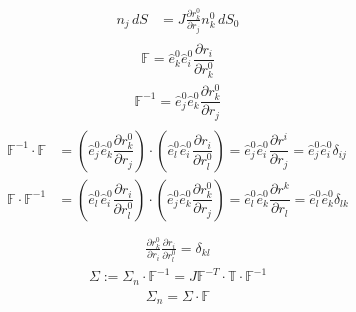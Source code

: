 \documentclass[letterpaper,10pt,english]{jupyterBook}
\begin{document}
\begin{equation*}
\begin{split}
\begin{aligned}
  n_j \, dS & = J \frac{\partial r^0_k}{\partial r_j} n_k^0 \, dS_0
\end{aligned}\end{split}
\end{equation*}\begin{equation*}
\begin{split}\mathbb{F} = \hat{e}^0_k \hat{e}^0_i \dfrac{\partial r_i}{\partial r^0_k}\end{split}
\end{equation*}\begin{equation*}
\begin{split}\mathbb{F}^{-1} = \hat{e}^0_j \hat{e}^0_k \dfrac{\partial r^0_k}{\partial r_j}\end{split}
\end{equation*}\begin{equation*}
\begin{split}\begin{aligned}
\mathbb{F}^{-1} \cdot \mathbb{F} & = \left( \hat{e}^0_j \hat{e}^0_k \dfrac{\partial r^0_k}{\partial r_j} \right) \cdot \left( \hat{e}^0_l \hat{e}^0_i \dfrac{\partial r_i}{\partial r^0_l} \right) = \hat{e}^0_j \hat{e}^0_i \dfrac{\partial r^i}{\partial r_j} =  \hat{e}^0_j \hat{e}^0_i \delta_{ij} \\
\mathbb{F} \cdot \mathbb{F}^{-1} & = \left( \hat{e}^0_l \hat{e}^0_i \dfrac{\partial r_i}{\partial r^0_l} \right) \cdot \left( \hat{e}^0_j \hat{e}^0_k \dfrac{\partial r^0_k}{\partial r_j} \right) = \hat{e}^0_l \hat{e}^0_k \dfrac{\partial r^k}{\partial r_l} =  \hat{e}^0_l \hat{e}^0_k \delta_{lk} \\
\end{aligned}\end{split}
\end{equation*}\begin{equation*}
\begin{split}\frac{\partial r^0_k}{\partial r_i} \frac{\partial r_i}{\partial r^0_l} = \delta_{kl}\end{split}
\end{equation*}\begin{equation*}
\begin{split}\mathbb{\Sigma} := \mathbb{\Sigma}_n \cdot \mathbb{F}^{-1} = J \mathbb{F}^{-T} \cdot \mathbb{T} \cdot \mathbb{F}^{-1}\end{split}
\end{equation*}\begin{equation*}
\begin{split}\mathbb{\Sigma}_n = \mathbb{\Sigma} \cdot \mathbb{F}\end{split}

\end{equation*}
\end{document}
